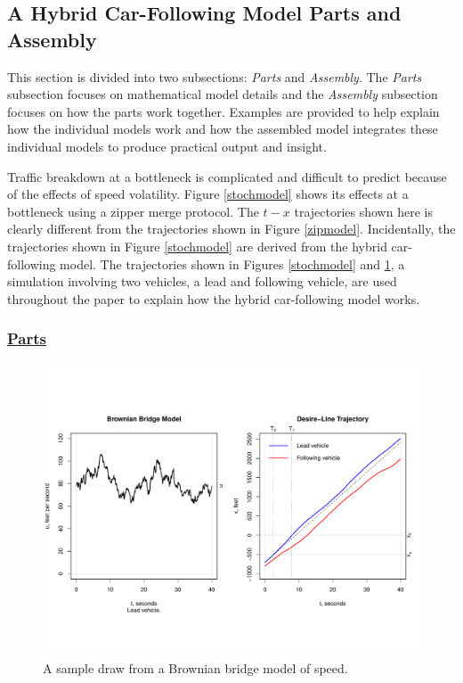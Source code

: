 \documentclass[Proceedings]{ascelike}
\begin{document}
 
\subsection{A Hybrid Car-Following Model Parts and Assembly} 

This section is divided into two subsections: \emph{Parts} and \emph{Assembly}. The \emph{Parts} subsection focuses on mathematical model details and the \emph{Assembly} subsection focuses on how the parts work together. Examples are provided to help explain how the individual models work and how the assembled model integrates these individual models to produce practical output and insight. 

Traffic breakdown at a bottleneck is complicated and difficult to predict because of the effects of speed volatility. Figure \ref{stochmodel} shows its effects  at a bottleneck using a zipper merge protocol. The $t-x$ trajectories  shown here  is clearly different from the trajectories shown in Figure \ref{zipmodel}. Incidentally, the trajectories shown in Figure \ref{stochmodel} are derived from the hybrid car-following model. The trajectories shown in Figures \ref{stochmodel} and \ref{bbmodel}, a simulation involving two vehicles, a lead and following vehicle, are used throughout the paper to explain how the hybrid car-following model works.

\subsubsection{\underline{Parts} }

\begin{figure}
\centering
\includegraphics[width = 5.5in]{Rplot03.pdf}
\caption{A sample draw from a Brownian bridge model of speed. }
\label{bbmodel}
\end{figure}
\end{document}
